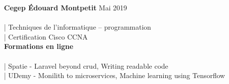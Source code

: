 \documentclass[margin, 10pt]{res} %
\begin{document}
\begin{resume}
{\textbf{Cegep Édouard Montpetit}} \hfill Mai 2019 \\\\
| Techniques de l’informatique – programmation \\
| Certification Cisco CCNA \\

{\textbf{Formations en ligne}} \hfill  \\\\
| Spatie - Laravel beyond crud, Writing readable code \\
| UDemy - Monilith to microservices, Machine learning using Tensorflow \\



\end{resume}
\end{document}
